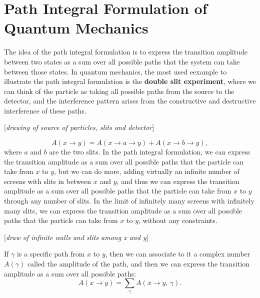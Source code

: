 \section{Path Integral Formulation of Quantum Mechanics}

The idea of the path integral formulation is to express the transition amplitude between two states as a sum over all possible paths that the system can take between those states. In quantum mechanics, the most used eexample to illustrate the path integral formulation is the \textbf{double slit experiment}, where we can think of the particle as taking all possible paths from the source to the detector, and the interference pattern arises from the constructive and destructive interference of these paths.

    [\textit{drawing of source of particles, slits and detector}]

\[
    A(x \to y) = A (x \to a \to y) + A (x \to b \to y),
\]
where \(a\) and \(b\) are the two slits. In the path integral formulation, we can express the transition amplitude as a sum over all possible paths that the particle can take from \(x\) to \(y\), but we can do more, adding virtually an infinite number of screens with slits in between \(x\) and \(y\), and thus we can express the transition amplitude as a sum over all possible paths that the particle can take from \(x\) to \(y\) through any number of slits. In the limit of infinitely many screens with infinitely many slits, we can express the transition amplitude as a sum over all possible paths that the particle can take from \(x\) to \(y\), without any constraints.

    [\textit{draw of infinite walls and slits among x and y}]

If \(\gamma\) is a specific path from \(x\) to \(y\), then we can associate to it a complex number \(A(\gamma)\) called the amplitude of the path, and then we can express the transition amplitude as a sum over all possible paths:
\[
    A(x \to y) = \sum_{\gamma} A(x \to y,\, \gamma).
\]

